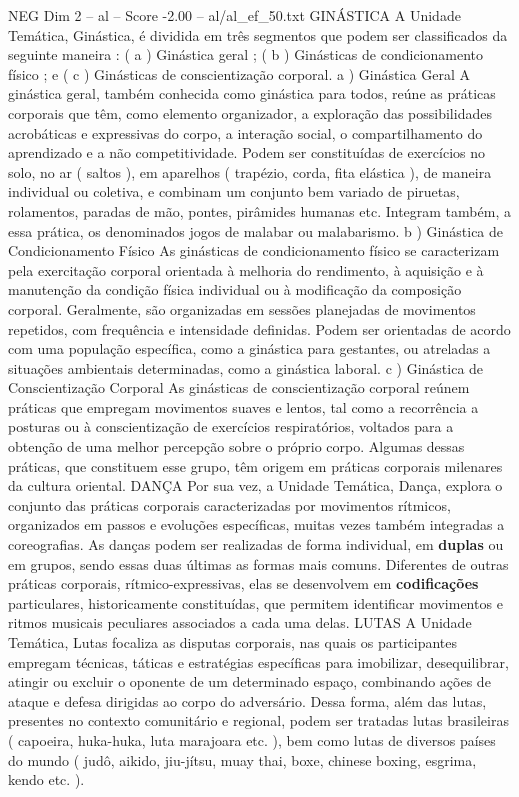 \begin{textsample}{NEG Dim 2 – al – Score -2.00 – al/al\_ef\_50.txt}  \label{ex:f2_neg_028}
GINÁSTICA A Unidade Temática, Ginástica, é dividida em três segmentos que podem ser classificados da seguinte maneira : ( a ) Ginástica geral ; ( b ) Ginásticas de condicionamento físico ; e ( c ) Ginásticas de conscientização corporal. a ) Ginástica Geral A ginástica geral, também conhecida como ginástica para todos, reúne as práticas corporais que têm, como elemento organizador, a exploração das possibilidades acrobáticas e expressivas do corpo, a interação social, o compartilhamento do aprendizado e a não competitividade.
Podem ser constituídas de exercícios no solo, no ar ( saltos ), em aparelhos ( trapézio, corda, fita elástica ), de maneira individual ou coletiva, e combinam um conjunto bem variado de piruetas, rolamentos, paradas de mão, pontes, pirâmides humanas etc.
Integram também, a essa prática, os denominados jogos de malabar ou malabarismo. b ) Ginástica de Condicionamento Físico As ginásticas de condicionamento físico se caracterizam pela exercitação corporal orientada à melhoria do rendimento, à aquisição e à manutenção da condição física individual ou à modificação da composição corporal.
Geralmente, são organizadas em sessões planejadas de movimentos repetidos, com frequência e intensidade definidas.
Podem ser orientadas de acordo com uma população específica, como a ginástica para gestantes, ou atreladas a situações ambientais determinadas, como a ginástica laboral. c ) Ginástica de Conscientização Corporal As ginásticas de conscientização corporal reúnem práticas que empregam movimentos suaves e lentos, tal como a recorrência a posturas ou à conscientização de exercícios respiratórios, voltados para a obtenção de uma melhor percepção sobre o próprio corpo.
Algumas dessas práticas, que constituem esse grupo, têm origem em práticas corporais milenares da cultura oriental.
DANÇA Por sua vez, a Unidade Temática, Dança, explora o conjunto das práticas corporais caracterizadas por movimentos rítmicos, organizados em passos e evoluções específicas, muitas vezes também integradas a coreografias.
As danças podem ser realizadas de forma individual, em \textbf{duplas} ou em grupos, sendo essas duas últimas as formas mais comuns.
Diferentes de outras práticas corporais, rítmico-expressivas, elas se desenvolvem em \textbf{codificações} particulares, historicamente constituídas, que permitem identificar movimentos e ritmos musicais peculiares associados a cada uma delas.
LUTAS A Unidade Temática, Lutas focaliza as disputas corporais, nas quais os participantes empregam técnicas, táticas e estratégias específicas para imobilizar, desequilibrar, atingir ou excluir o oponente de um determinado espaço, combinando ações de ataque e defesa dirigidas ao corpo do adversário.
Dessa forma, além das lutas, presentes no contexto comunitário e regional, podem ser tratadas lutas brasileiras ( capoeira, huka-huka, luta marajoara etc. ), bem como lutas de diversos países do mundo ( judô, aikido, jiu-jítsu, muay thai, boxe, chinese boxing, esgrima, kendo etc. ).

\end{textsample}

